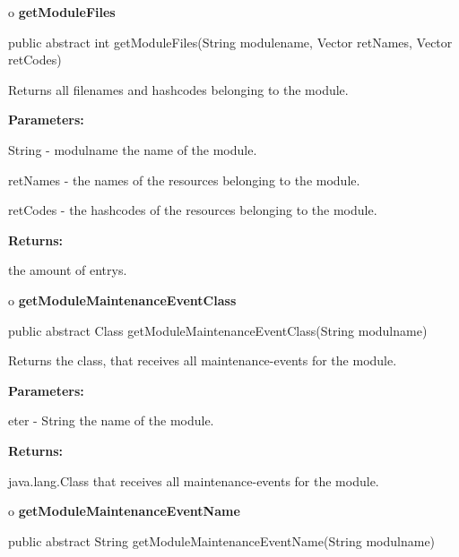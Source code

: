 o {\bf getModuleFiles} 

\begin{PRE}
 public abstract int getModuleFiles(String modulename,
                                    Vector retNames,
                                    Vector retCodes)
\end{PRE}

\begin{description}
\htmlDD Returns all filenames and hashcodes belonging to the module. 

\begin{description}
\item {\bf Parameters:}  

String - modulname the name of the module.  

retNames - the names of the resources belonging to the module.  

retCodes - the hashcodes of the resources belonging to the module.  
\item {\bf Returns:}  

the amount of entrys.  
\end{description}

\end{description}

o {\bf getModuleMaintenanceEventClass} 

\begin{PRE}
 public abstract Class getModuleMaintenanceEventClass(String modulname)
\end{PRE}

\begin{description}
\htmlDD Returns the class, that receives all maintenance-events for the
module. 

\begin{description}
\item {\bf Parameters:}  

eter - String the name of the module.  
\item {\bf Returns:}  

java.lang.Class that receives all maintenance-events for the module.  
\end{description}

\end{description}

o {\bf getModuleMaintenanceEventName} 

\begin{PRE}
 public abstract String getModuleMaintenanceEventName(String modulname)
\end{PRE}

